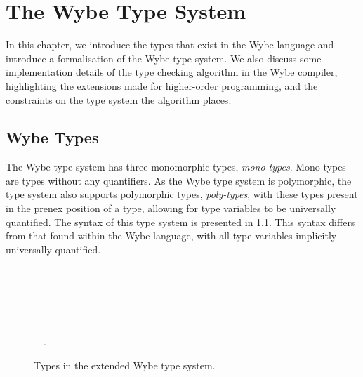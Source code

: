 \clearpage

\def\chaptertitle{The Wybe Type System}

\lhead{\emph{\chaptertitle}}

\chapter{\chaptertitle}
\label{ch:types}

In this chapter, we introduce the types that exist in the Wybe language and introduce a formalisation of the Wybe type system. We also discuss some implementation details of the type checking algorithm in the Wybe compiler, highlighting the extensions made for higher-order programming, and the constraints on the type system the algorithm places.

\section{Wybe Types}
\label{sec:wybe-types}

The Wybe type system has three monomorphic types, \textit{mono-types}. Mono-types are types without any quantifiers. As the Wybe type system is polymorphic, the type system also supports polymorphic types, \textit{poly-types}, with these types present in the prenex position of a type, allowing for type variables to be universally quantified. The syntax of this type system is presented in \cref{fig:wybe-types}. This syntax differs from that found within the Wybe language, with all type variables implicitly universally quantified. 

\begin{figure}[ht]
  \centering
  \begin{bnf*}
      {}\\
      \\
      \\
      {\ }\\
      {\ \mid\ \ \mid\ }\\
      {\ \mid\ \forall{}. }
  \end{bnf*}
  \caption{Types in the extended Wybe type system.}
  \label{fig:wybe-types}
\end{figure}

